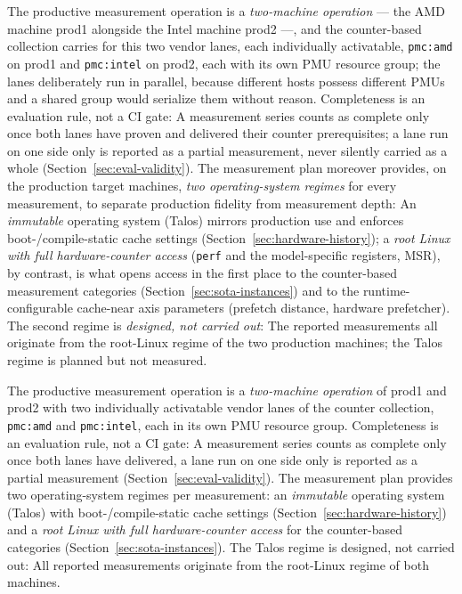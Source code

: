 \begin{nurlang}
The productive measurement operation is a \emph{two-machine operation} --- the AMD machine prod1
alongside the Intel machine prod2 ---, and the counter-based collection carries for this two vendor
lanes, each individually activatable, \texttt{pmc:amd} on prod1 and \texttt{pmc:intel} on prod2, each
with its own PMU resource group; the lanes deliberately run in parallel, because different hosts
possess different PMUs and a shared group would serialize them without reason. Completeness is an
evaluation rule, not a CI gate: A measurement series counts as complete only once both lanes have
proven and delivered their counter prerequisites; a lane run on one side only is reported as a partial
measurement, never silently carried as a whole (Section~\ref{sec:eval-validity}). The measurement plan
moreover provides, on the production target machines, \emph{two operating-system regimes} for every
measurement, to separate production fidelity from measurement depth: An \emph{immutable} operating
system (Talos) mirrors production use and enforces boot-/compile-static cache settings
(Section~\ref{sec:hardware-history}); a \emph{root Linux with full hardware-counter access}
(\texttt{perf} and the model-specific registers, MSR), by contrast, is what opens access in the first
place to the counter-based measurement categories (Section~\ref{sec:sota-instances}) and to the
runtime-configurable cache-near axis parameters (prefetch distance, hardware prefetcher). The second
regime is \emph{designed, not carried out}: The reported measurements all originate from the
root-Linux regime of the two production machines; the Talos regime is planned but not measured.
\end{nurlang}
\begin{nurkurz}
The productive measurement operation is a \emph{two-machine operation} of prod1 and prod2 with two
individually activatable vendor lanes of the counter collection, \texttt{pmc:amd} and \texttt{pmc:intel},
each in its own PMU resource group. Completeness is an evaluation rule, not a CI gate: A measurement series
counts as complete only once both lanes have delivered, a lane run on one side only is reported as a partial
measurement (Section~\ref{sec:eval-validity}). The measurement plan provides two operating-system regimes
per measurement: an \emph{immutable} operating system (Talos) with boot-/compile-static cache settings
(Section~\ref{sec:hardware-history}) and a \emph{root Linux with full hardware-counter access} for the
counter-based categories (Section~\ref{sec:sota-instances}). The Talos regime is designed, not carried out:
All reported measurements originate from the root-Linux regime of both machines.
\end{nurkurz}

